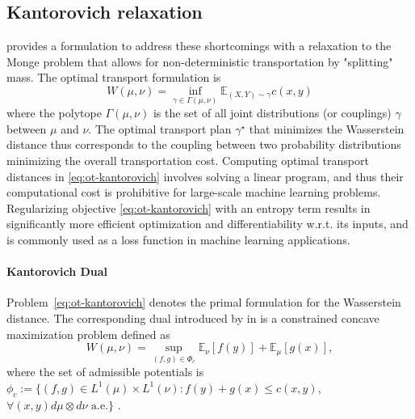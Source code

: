 \subsection{Kantorovich relaxation}  %
\citeauthor{kantorovich1942} provides a formulation to address these shortcomings with a relaxation to the
Monge problem that allows for non-deterministic transportation by "splitting" mass.
The \citet{kantorovich1942} optimal transport formulation is 
\begin{equation}\label{eq:ot-kantorovich}
W(\mu, \nu)= \inf _{\gamma \in \Gamma(\mu, \nu)} \mathbb{E}_{(X, Y) \sim \gamma}c(x, y)
\end{equation}
where the polytope $\Gamma(\mu, \nu)$ is the set of all joint distributions (or couplings) $\gamma$ between $\mu$ and $\nu$.
The optimal transport plan $\gamma^\star$ that minimizes the Wasserstein distance thus corresponds to the coupling between two probability distributions minimizing the overall transportation cost.
Computing optimal transport distances in \eqref{eq:ot-kantorovich} involves solving a linear program,
and thus their computational cost is prohibitive for large-scale machine learning problems.
Regularizing objective \eqref{eq:ot-kantorovich} with an entropy term results in significantly more efficient optimization
\citep{cuturi2013} and differentiability w.r.t. its inputs, and is commonly used as a loss function in machine learning applications.


\paragraph{Kantorovich Dual}
Problem~\eqref{eq:ot-kantorovich} denotes the primal formulation for the Wasserstein distance. The corresponding dual introduced by \citeauthor{kantorovich1942} in \citeyear{kantorovich1942} is a constrained concave maximization problem defined as
\begin{equation} \label{eq:ot-dual}
    W(\mu, \nu)=\sup _{(f, g) \in \Phi_{c}} \mathbb{E}_{\nu}[f(y)]+\mathbb{E}_{\mu}[g(x)],
\end{equation}
where the set of admissible potentials is $\phi_c := \{(f, g) \in L^{1}(\mu) \times L^{1}(\nu): f(y)+g(x) \leq c(x, y)$, $\forall(x, y) d\mu \otimes d\nu \text{ a.e.}\}$ \citep[Theorem 1.3]{villani2003}.

